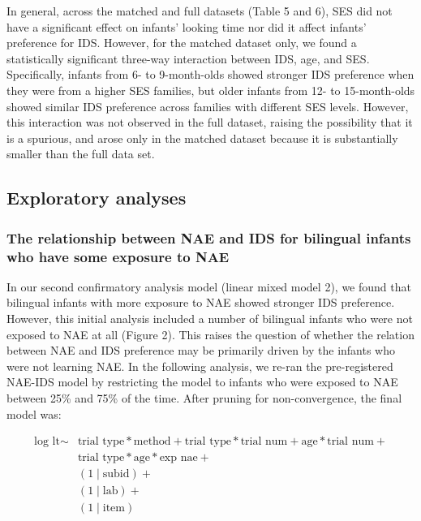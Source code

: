 \documentclass[,man,floatsintext]{apa6}
\begin{document}
In general, across the matched and full datasets (Table 5 and 6), SES did not have a significant effect on infants' looking time nor did it affect infants' preference for IDS. However, for the matched dataset only, we found a statistically significant three-way interaction between IDS, age, and SES. Specifically, infants from 6- to 9-month-olds showed stronger IDS preference when they were from a higher SES families, but older infants from 12- to 15-month-olds showed similar IDS preference across families with different SES levels. However, this interaction was not observed in the full dataset, raising the possibility that it is a spurious, and arose only in the matched dataset because it is substantially smaller than the full data set.

\hypertarget{exploratory-analyses}{%
\subsection{Exploratory analyses}\label{exploratory-analyses}}

\hypertarget{the-relationship-between-nae-and-ids-for-bilingual-infants-who-have-some-exposure-to-nae}{%
\subsubsection{The relationship between NAE and IDS for bilingual infants who have some exposure to NAE}\label{the-relationship-between-nae-and-ids-for-bilingual-infants-who-have-some-exposure-to-nae}}

In our second confirmatory analysis model (linear mixed model 2), we found that bilingual infants with more exposure to NAE showed stronger IDS preference. However, this initial analysis included a number of bilingual infants who were not exposed to NAE at all (Figure 2). This raises the question of whether the relation between NAE and IDS preference may be primarily driven by the infants who were not learning NAE. In the following analysis, we re-ran the pre-registered NAE-IDS model by restricting the model to infants who were exposed to NAE between 25\% and 75\% of the time. After pruning for non-convergence, the final model was:

\begin{equation}
\begin{split}
\text{log lt} \sim & \text{trial type} * \text{method} + \text{trial type} * \text{trial num} + \text{age} * \text{trial num} + \\
& \text{trial type} * \text{age} * \text{exp nae} + \\
& (1 \mid \text{subid}) + \\
& (1 \mid \text{lab}) + \\
& (1 \mid \text{item})
\end{split}
\end{equation}
\end{document}
